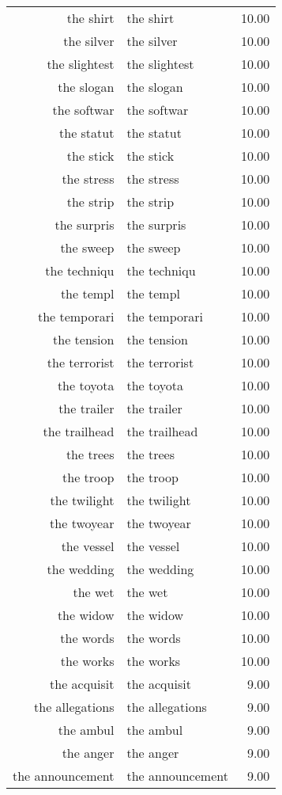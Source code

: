 \begin{table}[ht]
\begin{tabular}{rlr}
  the shirt & the shirt & 10.00 \\ 
  the silver & the silver & 10.00 \\ 
  the slightest & the slightest & 10.00 \\ 
  the slogan & the slogan & 10.00 \\ 
  the softwar & the softwar & 10.00 \\ 
  the statut & the statut & 10.00 \\ 
  the stick & the stick & 10.00 \\ 
  the stress & the stress & 10.00 \\ 
  the strip & the strip & 10.00 \\ 
  the surpris & the surpris & 10.00 \\ 
  the sweep & the sweep & 10.00 \\ 
  the techniqu & the techniqu & 10.00 \\ 
  the templ & the templ & 10.00 \\ 
  the temporari & the temporari & 10.00 \\ 
  the tension & the tension & 10.00 \\ 
  the terrorist & the terrorist & 10.00 \\ 
  the toyota & the toyota & 10.00 \\ 
  the trailer & the trailer & 10.00 \\ 
  the trailhead & the trailhead & 10.00 \\ 
  the trees & the trees & 10.00 \\ 
  the troop & the troop & 10.00 \\ 
  the twilight & the twilight & 10.00 \\ 
  the twoyear & the twoyear & 10.00 \\ 
  the vessel & the vessel & 10.00 \\ 
  the wedding & the wedding & 10.00 \\ 
  the wet & the wet & 10.00 \\ 
  the widow & the widow & 10.00 \\ 
  the words & the words & 10.00 \\ 
  the works & the works & 10.00 \\ 
  the acquisit & the acquisit & 9.00 \\ 
  the allegations & the allegations & 9.00 \\ 
  the ambul & the ambul & 9.00 \\ 
  the anger & the anger & 9.00 \\ 
  the announcement & the announcement & 9.00 \\ 

\end{tabular}
\end{table}
